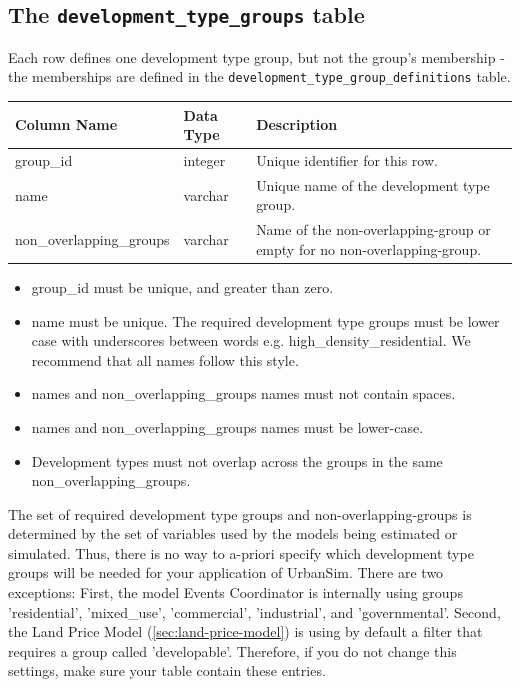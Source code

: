 \subsection{The {\tt development_type_groups} table}
\label{sec:development-tables-type-groups}

Each row defines one development type group, but not the group's
membership - the memberships are defined in the \verb|development_type_group_definitions| table.

\begin{tabular}{|l|l|l|}

\hline
\textbf{Column Name} & \textbf{Data Type} & \textbf{Description} \\

\hline group_id & integer & Unique identifier for this row.  \\

\hline name & varchar & Unique name of the development type group.  \\

\hline non_overlapping_groups & varchar & Name of the non-overlapping-group or
empty for no non-overlapping-group.  \\

\hline
\end{tabular}

\begin{itemize}
\tight
\item group_id must be unique, and greater than zero.
\item name must be unique. The required development type groups must be lower
case with underscores between words e.g. high_density_residential. We recommend
that all names follow this style.
\item names and non_overlapping_groups names must not contain spaces.
\item names and non_overlapping_groups names must be lower-case.
\item Development types must not overlap across the groups in the same
non_overlapping_groups.
\end{itemize}

The set of required development type groups and non-overlapping-groups is
determined by the set of variables used by the models being estimated or
simulated.  Thus, there is no way to a-priori specify which development type
groups will be needed for your application of UrbanSim. There are two exceptions:
First, the model Events Coordinator is internally using groups 'residential', 'mixed_use', 'commercial',
'industrial', and 'governmental'. Second, the Land Price Model (\ref{sec:land-price-model}) is using by default a filter
that requires a group called 'developable'. Therefore, if you do not change this settings, make sure your
table contain these entries.

